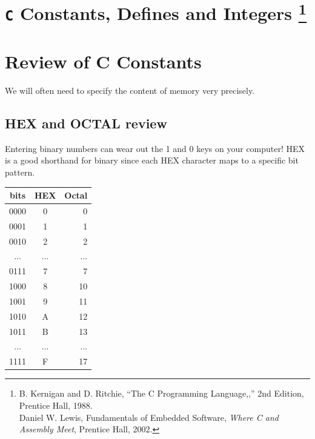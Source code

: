 \documentclass{article}	%
\begin{document}
\section*{{\tt C} Constants, Defines and Integers \footnote{
 B. Kernigan and D. Ritchie, ``The C Programming Language,,''
 2nd Edition, Prentice Hall, 1988.  \\
 Daniel W. Lewis, Fundamentals of
 Embedded Software, {\it Where C and Assembly Meet}, Prentice Hall, 2002.}
 }


\section{Review of C Constants}

We will often need to specify the content of memory
very precisely.

\subsection{HEX and OCTAL review}

Entering binary numbers can wear out the 1 and 0 keys on
your computer!   HEX is a good shorthand for binary since
each HEX character maps to a specific bit pattern.


\vspace{0.2in}	%
\begin{tabular}{|c|c|r|}
\hline
bits  &  HEX & Octal \\ \hline
0000  &  0   & 0     \\ \hline
0001  &  1   & 1     \\ \hline
0010  &  2   & 2     \\ \hline
...   &  ...    & ...      \\ \hline
0111  &  7   & 7     \\ \hline
1000  &  8   & 10     \\ \hline
1001  &  9   & 11     \\ \hline
1010  &  A   & 12     \\ \hline
1011  &  B   & 13     \\ \hline

...   & ...  & ...   \\ \hline
1111  &  F   & 17     \\
\hline
\end{tabular}

\vspace{0.2in}	%
\end{document}
